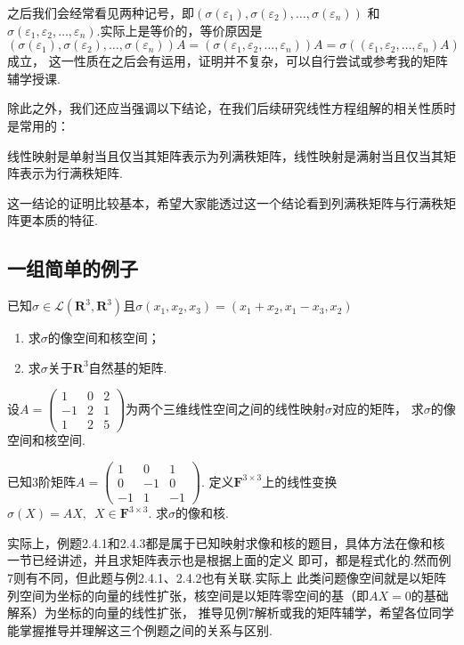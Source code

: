 之后我们会经常看见两种记号，即$(\sigma(\varepsilon_1),\sigma(\varepsilon_2),\ldots,\sigma(\varepsilon_n))$
和$\sigma(\varepsilon_1,\varepsilon_2,\ldots,\varepsilon_n)$.实际上是等价的，等价原因是
$(\sigma(\varepsilon_1),\sigma(\varepsilon_2),\ldots,\sigma(\varepsilon_n))A=(\sigma(\varepsilon_1,\varepsilon_2,\ldots,\varepsilon_n))A=\sigma((\varepsilon_1,\varepsilon_2,\ldots,\varepsilon_n)A)$成立，
这一性质在之后会有运用，证明并不复杂，可以自行尝试或参考我的矩阵辅学授课.

除此之外，我们还应当强调以下结论，在我们后续研究线性方程组解的相关性质时是常用的：
\begin{theorem}
    线性映射是单射当且仅当其矩阵表示为列满秩矩阵，线性映射是满射当且仅当其矩阵表示为行满秩矩阵.
\end{theorem}
这一结论的证明比较基本，希望大家能透过这一个结论看到列满秩矩阵与行满秩矩阵更本质的特征.
\subsection{一组简单的例子}
\begin{example}
    已知$\sigma \in \mathcal{L}(\mathbf{R}^3,\mathbf{R}^3)$且$\sigma(x_1,x_2,x_3)=(x_1+x_2,x_1-x_3, x_2)$
    \begin{enumerate}[label=(\arabic*)]
        \item 求$\sigma$的像空间和核空间；

        \item 求$\sigma$关于$\mathbf{R}^3$自然基的矩阵.
    \end{enumerate}
\end{example}

\begin{example}
    设$A=\begin{pmatrix}1 & 0 & 2 \\ -1 & 2 & 1 \\ 1 & 2 & 5\end{pmatrix}$为两个三维线性空间之间的线性映射$\sigma$对应的矩阵，
    求$\sigma$的像空间和核空间.
\end{example}

\begin{example}
    已知3阶矩阵$A=\begin{pmatrix}
        1 & 0 & 1 \\ 0 & -1 & 0 \\ -1 & 1 & -1
    \end{pmatrix}$. 定义$\mathbf{F}^{3 \times 3}$上的线性变换$\sigma(X)=AX,\enspace X \in \mathbf{F}^{3 \times 3}$.
    求$\sigma$的像和核.
\end{example}
实际上，例题2.4.1和2.4.3都是属于已知映射求像和核的题目，具体方法在像和核一节已经讲述，并且求矩阵表示也是根据上面的定义
即可，都是程式化的.然而例7则有不同，但此题与例2.4.1、2.4.2也有关联.实际上
此类问题像空间就是以矩阵列空间为坐标的向量的线性扩张，核空间是以矩阵零空间的基（即$AX=0$的基础解系）为坐标的向量的线性扩张，
推导见例7解析或我的矩阵辅学，希望各位同学能掌握推导并理解这三个例题之间的关系与区别. %

